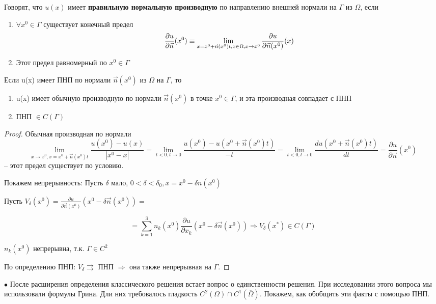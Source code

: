 \begin{definition}
Говорят, что $u(x)$ имеет \textbf{правильную нормальную производную} по направлению внешней нормали на $\Gamma$ из $\Omega$, если  
\begin{enumerate}
\item $\forall x^0 \in \Gamma$ существует конечный предел 
$$\frac{\partial u}{\partial \vec{n}}(x^0) \equiv \lim_{x = x^0 + \vec{n}(x^0)t,\\ x \in \Omega, \\ x \to x^0} \frac{\partial u}{\partial \vec{n}(x^0)}(x)$$

\item Этот предел равномерный по $x^0 \in \Gamma$
\end{enumerate}
\end{definition}
\begin{lemma}
Если u(x) имеет ПНП по нормали $\vec{n}(x^0)$ из $\Omega$ на $\Gamma$, то 
\begin{enumerate}
\item u(x) имеет обычную производную по нормали $\vec{n}(x^0)$ в точке $x^0 \in \Gamma$, и эта производная совпадает с ПНП 

\item ПНП $\in C(\Gamma)$
\end{enumerate}
\end{lemma}
\begin{proof} Обычная производная по нормали $$\lim_{x \to x^0, x = x^0 + \vec{n}(x^0)t} \frac{u(x^0) - u(x)}{|x^0 - x|} = \lim_{t < 0, t \to 0} \frac{u(x^0) - u(x^0 + \vec{n}(x^0)t)}{-t} = \lim_{t < 0, t \to 0} \frac{du(x^0 + \vec{n}(x^0)t)}{dt} = \frac{\partial u}{\partial \vec{n}}(x^0)$$ -- этот предел существует по условию.

Покажем непрерывность: Пусть $\delta$ мало, $0 < \delta < \delta_0, x = x^0 - \delta n(x^0)$

Пусть $V_{\delta}(x^0) = \frac{\partial u}{\partial \vec{n}(x^0)}(x^0 - \delta \vec{n}(x^0))= $

$$=\sum_{k=1}^{3} n_k(x^0)\frac{\partial u}{\partial x_k}(x^0 - \delta \vec{n}(x^0)) \Rightarrow V_{\delta}(x^*) \in C(\Gamma) $$

$n_k(x^0)$ непрерывна, т.к. $\Gamma \in C^2$

По определению ПНП: $V_{\delta} \rightrightarrows $ ПНП $\Rightarrow$ она также непрерывная на $\Gamma$. 
\end{proof}
$\bullet$ После расширения определения классического решения встает вопрос о единственности решения. При исследовании этого вопроса мы использовали формулы Грина. Дли них требовалось гладкость $C^2(\Omega) \cap C^1(\overline{\Omega})$. Покажем, как обобщить эти факты с помощью ПНП.

